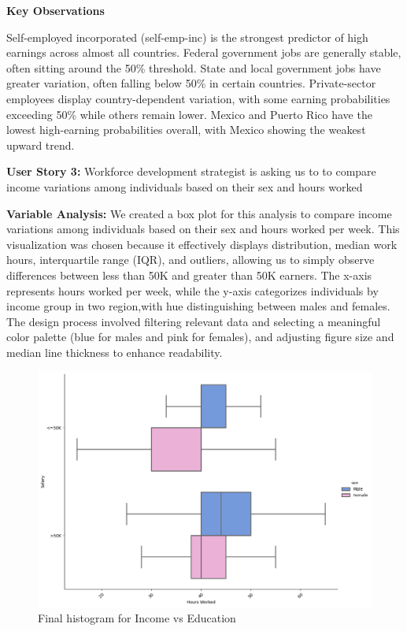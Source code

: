 \documentclass[journal,onecolumn]{IEEEtran}
\begin{document}
\medskip

\textbf{Key Observations}

Self-employed incorporated (self-emp-inc) is the strongest predictor of high earnings across almost all countries.
Federal government jobs are generally stable, often sitting around the 50\% threshold.
State and local government jobs have greater variation, often falling below 50\% in certain countries.
Private-sector employees display country-dependent variation, with some earning probabilities exceeding 50\% while others remain lower.
Mexico and Puerto Rico have the lowest high-earning probabilities overall, with Mexico showing the weakest upward trend.

\medskip

\textbf{User Story 3:} Workforce development strategist is asking us to to 
compare income variations among individuals based on their sex and hours worked

\textbf{Variable Analysis:} We created a box plot for this analysis to compare 
income variations among individuals based on their sex and hours worked per week.
This visualization was chosen because it effectively displays distribution,
median work hours, interquartile range (IQR), and outliers, allowing us
to simply observe differences between less than 50K and greater than 50K earners. The x-axis
represents hours worked per week, while the y-axis categorizes individuals by income group
in two region,with hue distinguishing between males and females.
The design process involved filtering relevant data and selecting a meaningful
color palette (blue for males and pink for females), and adjusting figure size
and median line thickness to enhance readability.

\begin{figure}[h]
    \centering
    \includegraphics[width=0.9\linewidth]{gender_hours.png}  %
    \caption{Final histogram for Income vs Education}
    \label{fig:final_income_vs_education}
\end{figure}
\end{document}
